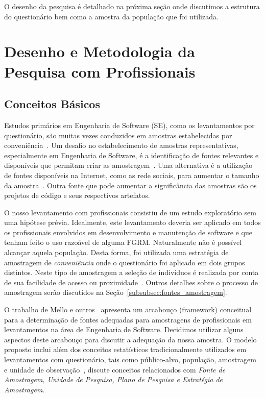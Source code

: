 O desenho da pesquisa é detalhado na próxima seção onde discutimos a estrutura
do questionário bem como a amostra da população que foi utilizada.

\section{Desenho e Metodologia da Pesquisa com Profissionais}
\label{sec:desenho_da_pesquisa_com_profissionais}

\subsection{Conceitos Básicos}

Estudos primários em Engenharia de Software (SE), como os levantamentos por
questionário, são muitas vezes conduzidos em amostras estabelecidas por
conveniência~\cite{sjoberg2005survey, dybaa2006systematic}. Um desafio no
estabelecimento de amostras representativas, especialmente em Engenharia de
Software, é a identificação de fontes relevantes e disponíveis que permitam
criar as amostragem~\cite{de2014towards}. Uma alternativa é a utilização de
fontes disponíveis na Internet, como as rede sociais, para aumentar o tamanho da
amostra~\cite{de2013would}. Outra fonte que pode aumentar a significância das
amostras são os projetos de código e seus respectivos artefatos.

O nosso levantamento com profissionais consistiu de um estudo exploratório sem
uma hipótese prévia. Idealmente, este levantamento deveria ser aplicado em todos
os profissionais envolvidos em desenvolvimento e manutenção de software e que
tenham feito o uso razoável de alguma FGRM\@. Naturalmente não é possível alcançar
aquela população. Desta forma, foi utilizada uma estratégia de amostragem de
\textit{conveniência} onde o questionário foi aplicado em dois grupos distintos.
Neste tipo de amostragem a seleção de indivíduos é realizada por conta de sua
facilidade de acesso ou proximidade~\cite{marshall1996sampling}. Outros detalhes
sobre o processo de amostragem serão discutidos na
Seção~\ref{subsubsec:fontes_amostragem}.

O trabalho de Mello e outros~\cite{de2014towards} apresenta um
arcabouço (framework) conceitual para a determinação de fontes adequadas para
amostragens de profissionais em levantamentos na área de Engenharia de Software.
Decidimos utilizar alguns aspectos deste arcabouço para discutir a adequação da
nossa amostra. O modelo proposto inclui além dos conceitos estatísticos
tradicionalmente utilizados em levantamentos com questionário, tais como
público-alvo, população, amostragem e unidade de
observação~\cite{thompson2012sampling}, discute conceitos relacionados com
\textit{Fonte de Amostragem, Unidade de Pesquisa, Plano de Pesquisa e Estratégia
	de Amostragem}.

